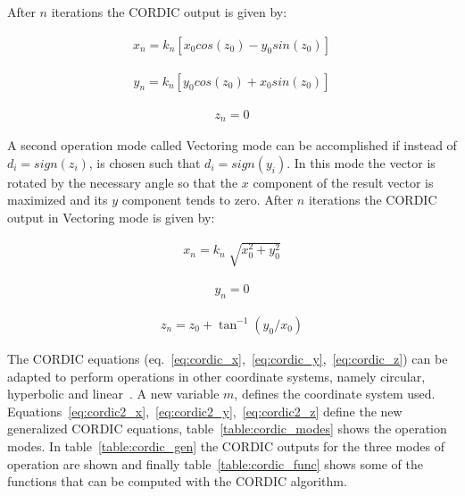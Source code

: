 After $n$ iterations the CORDIC output is given by:


\begin{equation} 
\begin{gathered}
x_{n} = k_n [x_{0} cos(z_{0}) - y_{0} sin(z_{0})]
    \label{eq:cordic_rotation_x}
\end{gathered}
\end{equation}

\begin{equation} 
\begin{gathered}
y_{n} = k_n [y_{0} cos(z_{0}) + x_{0} sin(z_{0})]
    \label{eq:cordic_rotation_y}
\end{gathered}
\end{equation}

\begin{equation} 
\begin{gathered}
z_{n} = 0
    \label{eq:cordic_rotation_z}
\end{gathered}
\end{equation}

A second operation mode called Vectoring mode can be accomplished if instead of $d_{i} = sign(z_{i})$, is chosen such that $d_{i} = sign(y_{i})$. In this mode the vector is rotated by the necessary angle so that the $x$ component of the result vector is maximized and its $y$ component tends to zero. After $n$ iterations the CORDIC output in Vectoring mode is given by:


\begin{equation} 
\begin{gathered}
x_{n} = k_n \sqrt[]{x_0^2 + y_0^2} 
    \label{eq:cordic_vectoring_x}
\end{gathered}
\end{equation}

\begin{equation} 
\begin{gathered}
y_{n} = 0
    \label{eq:cordic_vectoring_y}
\end{gathered}
\end{equation}

\begin{equation} 
\begin{gathered}
z_n = z_0+\tan^{-1}(y_0/x_0)
    \label{eq:cordic_vectoring_z}
\end{gathered}
\end{equation}

The CORDIC equations (eq.~\ref{eq:cordic_x},~\ref{eq:cordic_y},~\ref{eq:cordic_z}) can be adapted to perform operations in other coordinate systems, namely circular, hyperbolic and linear~\cite{cordic_tiago}. A new variable $m$, defines the coordinate system used. Equations~\ref{eq:cordic2_x},~\ref{eq:cordic2_y},~\ref{eq:cordic2_z} define the new generalized CORDIC equations, table~\ref{table:cordic_modes} shows the operation modes. In table~\ref{table:cordic_gen} the CORDIC  outputs  for the three modes of operation are shown and finally table~\ref{table:cordic_func} shows some of the functions that can be computed with the CORDIC algorithm. 


